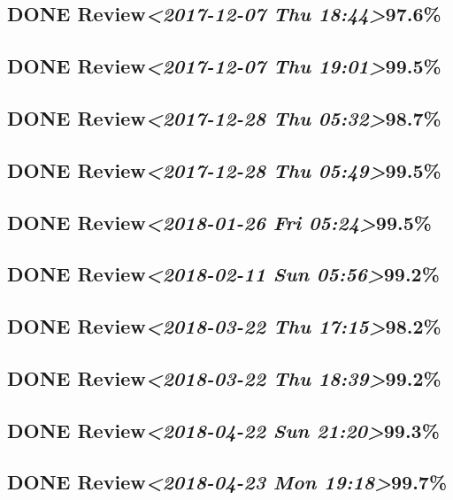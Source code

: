 \documentclass[11pt]{ctexart}
\begin{document}
\subsection{{\bfseries\sffamily DONE} Review\textit{<2017-12-07 Thu 18:44>}97.6\%}
\label{sec:org2d4a7e0}
\subsection{{\bfseries\sffamily DONE} Review\textit{<2017-12-07 Thu 19:01>}99.5\%}
\label{sec:orgbb6b094}
\subsection{{\bfseries\sffamily DONE} Review\textit{<2017-12-28 Thu 05:32>}98.7\%}
\label{sec:orgc0ee40e}
\subsection{{\bfseries\sffamily DONE} Review\textit{<2017-12-28 Thu 05:49>}99.5\%}
\label{sec:org3b05e74}
\subsection{{\bfseries\sffamily DONE} Review\textit{<2018-01-26 Fri 05:24>}99.5\%}
\label{sec:orge2a48c9}
\subsection{{\bfseries\sffamily DONE} Review\textit{<2018-02-11 Sun 05:56>}99.2\%}
\label{sec:org2ff51c7}
\subsection{{\bfseries\sffamily DONE} Review\textit{<2018-03-22 Thu 17:15>}98.2\%}
\label{sec:orgc6df95d}
\subsection{{\bfseries\sffamily DONE} Review\textit{<2018-03-22 Thu 18:39>}99.2\%}
\label{sec:org2b6c7c1}
\subsection{{\bfseries\sffamily DONE} Review\textit{<2018-04-22 Sun 21:20>}99.3\%}
\label{sec:org94436b8}
\subsection{{\bfseries\sffamily DONE} Review\textit{<2018-04-23 Mon 19:18>}99.7\%}
\label{sec:org7bc0f0d}
\end{document}
